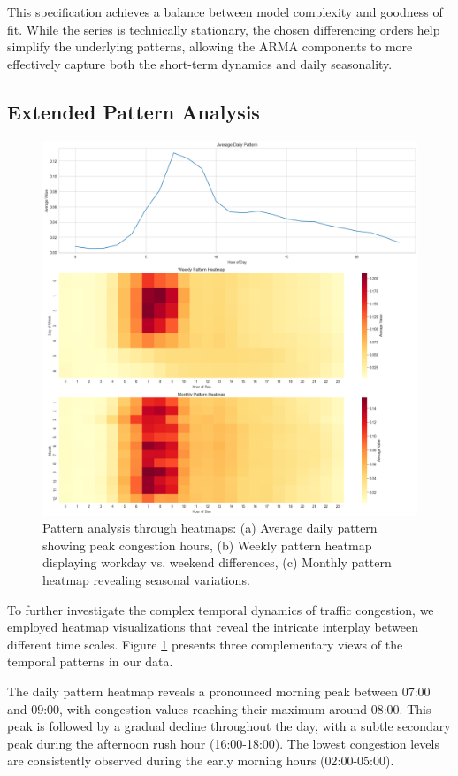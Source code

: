 \documentclass{article}
\begin{document}
This specification achieves a balance between model complexity and goodness of fit. While the series is technically stationary, the chosen differencing orders help simplify the underlying patterns, allowing the ARMA components to more effectively capture both the short-term dynamics and daily seasonality.

\subsection{Extended Pattern Analysis}
\begin{figure}[htbp]
    \centering
    \includegraphics[width=\textwidth]{pattern_heatmaps.png}
    \caption{Pattern analysis through heatmaps: (a) Average daily pattern showing peak congestion hours, (b) Weekly pattern heatmap displaying workday vs. weekend differences, (c) Monthly pattern heatmap revealing seasonal variations.}
    \label{fig:heatmaps}
\end{figure}

To further investigate the complex temporal dynamics of traffic congestion, we employed heatmap visualizations that reveal the intricate interplay between different time scales. Figure \ref{fig:heatmaps} presents three complementary views of the temporal patterns in our data.

The daily pattern heatmap reveals a pronounced morning peak between 07:00 and 09:00, with congestion values reaching their maximum around 08:00. This peak is followed by a gradual decline throughout the day, with a subtle secondary peak during the afternoon rush hour (16:00-18:00). The lowest congestion levels are consistently observed during the early morning hours (02:00-05:00).
\end{document}
